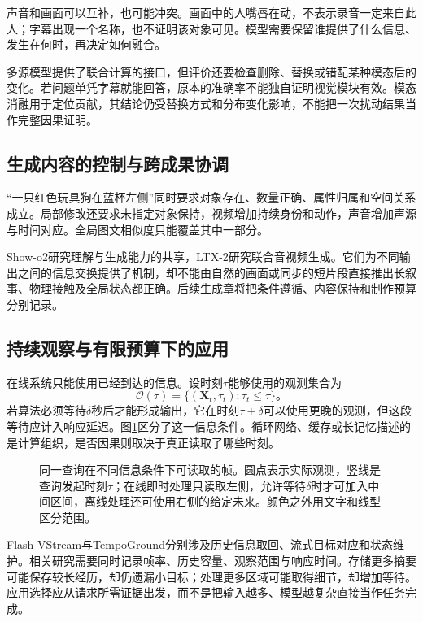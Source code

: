声音和画面可以互补，也可能冲突。画面中的人嘴唇在动，不表示录音一定来自此人；字幕出现一个名称，也不证明该对象可见。模型需要保留谁提供了什么信息、发生在何时，再决定如何融合。

多源模型提供了联合计算的接口，但评价还要检查删除、替换或错配某种模态后的变化。若问题单凭字幕就能回答，原本的准确率不能独自证明视觉模块有效。模态消融用于定位贡献，其结论仍受替换方式和分布变化影响，不能把一次扰动结果当作完整因果证明。

\subsection{生成内容的控制与跨成果协调}
\label{sec:vision-overview-generation-frontier}

“一只红色玩具狗在蓝杯左侧”同时要求对象存在、数量正确、属性归属和空间关系成立。局部修改还要求未指定对象保持，视频增加持续身份和动作，声音增加声源与时间对应。全局图文相似度只能覆盖其中一部分。

Show-o2研究理解与生成能力的共享，LTX-2研究联合音视频生成。它们为不同输出之间的信息交换提供了机制，却不能由自然的画面或同步的短片段直接推出长叙事、物理接触及全局状态都正确。后续生成章将把条件遵循、内容保持和制作预算分别记录。

\subsection{持续观察与有限预算下的应用}
\label{sec:vision-overview-streaming-frontier}

在线系统只能使用已经到达的信息。设时刻$\tau$能够使用的观测集合为
\begin{equation}
  \mathcal{O}(\tau)=\{(\bm{X}_t,\tau_t):\tau_t\leq\tau\}\text{。}
  \label{eq:vision-causal-observations}
\end{equation}
若算法必须等待$\delta$秒后才能形成输出，它在时刻$\tau+\delta$可以使用更晚的观测，但这段等待应计入响应延迟。图\ref{fig:vision-observation-window}区分了这一信息条件。循环网络、缓存或长记忆描述的是计算组织，是否因果则取决于真正读取了哪些时刻。

\begin{figure}[htbp]
  \centering
  
  \caption{同一查询在不同信息条件下可读取的帧。圆点表示实际观测，竖线是查询发起时刻$\tau$；在线即时处理只读取左侧，允许等待$\delta$时才可加入中间区间，离线处理还可使用右侧的给定未来。颜色之外用文字和线型区分范围。}
  \label{fig:vision-observation-window}
\end{figure}

Flash-VStream与TempoGround分别涉及历史信息取回、流式目标对应和状态维护。相关研究需要同时记录帧率、历史容量、观察范围与响应时间。存储更多摘要可能保存较长经历，却仍遗漏小目标；处理更多区域可能取得细节，却增加等待。应用选择应从请求所需证据出发，而不是把输入越多、模型越复杂直接当作任务完成。

